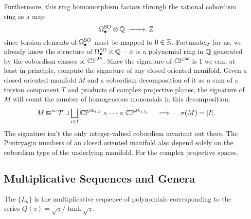 Furthermore, this ring homomorphism factors through the rational cobordism ring as a map \[\Omega_\bullet^\SO\otimes \Q \lkxto \Z\] since torsion elements of $\Omega_\bullet^{\operatorname{SO}}$ must be mapped to $0\in \mathbb{Z}$. Fortunately for us, we already know the structure of $\Omega_\bullet^{\operatorname{SO}}\otimes \mathbb{Q}$ -- it is a polynomial ring in $\mathbb{Q}$ generated by the cobordism classes of $\mathbb{CP}^{2k}$. Since the signature of $\mathbb{CP}^{2k}$ is $1$ we can, at least in principle, compute the signature of any closed oriented manifold. Given a closed oriented manifold $M$ and a cobordism decomposition of it as a sum of a torsion component $T$ and products of complex projective planes, the signature of $M$ will count the number of homogeneous monomials in this decomposition.
\[
	M\sobord T\sqcup \bigsqcup_{i\in I} \CP^{2k_{i,1}}\times\cdots \times\CP^{2k_{i,\ell_i}}
	\quad\implies\quad
	\sigma(M) = |I|.
\]
The signature isn't the only integer-valued cobordism invariant out there. The Pontryagin numbers of an closed oriented manifold also depend solely on the cobordism type of the underlying manifold. For the complex projective spaces,

\subsection{Multiplicative Sequences and Genera}


\begin{definition}
	The  $\{L_k\}$ is the multiplicative sequence of polynomials corresponding to the series $Q(z) = \sqrt{z}/\tanh\sqrt{z}$.
\end{definition}

